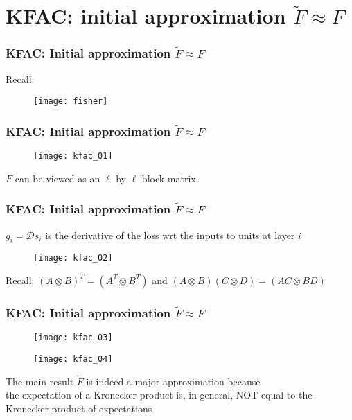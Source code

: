 \section{KFAC: initial approximation $\tilde{F} \approx F$}

\begin{frame}
\frametitle{KFAC: Initial approximation $\tilde{F} \approx F$}

Recall:
\begin{figure}
    \raggedright
    \texttt{[image: fisher]}
\end{figure}

\end{frame}

\begin{frame}
\frametitle{KFAC: Initial approximation $\tilde{F} \approx F$}

\begin{figure}
    \raggedright
    \texttt{[image: kfac\_01]}
\end{figure}

$F$ can be viewed as an $\ell$ by $\ell$ block matrix.
\end{frame}

\begin{frame}
\frametitle{KFAC: Initial approximation $\tilde{F} \approx F$}

$g_i = \mathcal{D}s_i$ is the derivative of the loss wrt the inputs to units at layer $i$
\begin{figure}
    \raggedright
    \texttt{[image: kfac\_02]}
\end{figure}

Recall: $(A \otimes B)^T = (A^T \otimes B^T)$ and $(A \otimes B) (C \otimes D) = (AC \otimes BD)$
\end{frame}

\begin{frame}
\frametitle{KFAC: Initial approximation $\tilde{F} \approx F$}

\begin{figure}
    \raggedright
    \texttt{[image: kfac\_03]}
\end{figure}

\begin{figure}
    \raggedright
    \texttt{[image: kfac\_04]}
\end{figure}

The main result $\tilde{F}$ is indeed a major approximation because\\
the expectation of a Kronecker product is, in general, NOT
equal to the Kronecker product of expectations

\end{frame}

